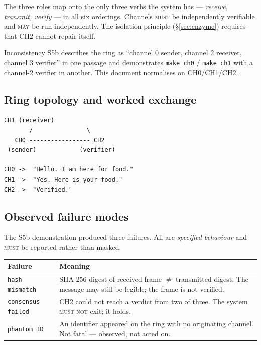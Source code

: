 \documentclass[11pt,a4paper]{article}
\newcommand{\MUST}{\textsc{must}}
\newcommand{\MUSTNOT}{\textsc{must not}}
\newcommand{\MAY}{\textsc{may}}
\begin{document}
The three roles map onto the only three verbs the system has ---
\emph{receive, transmit, verify} --- in all six orderings. Channels \MUST{} be
independently verifiable and \MAY{} be run independently. The isolation
principle (\S\ref{sec:enzyme}) requires that CH2 cannot repair itself.

\begin{errata}{Inconsistency}
S5b describes the ring as ``channel 0 sender, channel 2 receiver, channel 3
verifier'' in one passage and demonstrates \texttt{make ch0} / \texttt{make ch1}
with a channel-2 verifier in another. This document normalises on
CH0/CH1/CH2.
\end{errata}

\subsection{Ring topology and worked exchange}

\begin{Verbatim}[fontsize=\small,frame=single]
        CH1 (receiver)
       /               \
   CH0 ----------------- CH2
 (sender)            (verifier)

CH0 ->  "Hello. I am here for food."
CH1 ->  "Yes. Here is your food."
CH2 ->  "Verified."
\end{Verbatim}

\subsection{Observed failure modes}
\label{sec:failures}

The S5b demonstration produced three failures. All are \emph{specified
behaviour} and \MUST{} be reported rather than masked.

\begin{center}
\begin{tabular}{@{}lp{10.2cm}@{}}
\toprule
\textbf{Failure} & \textbf{Meaning} \\
\midrule
\texttt{hash mismatch} & SHA-256 digest of received frame $\neq$ transmitted
  digest. The message may still be legible; the frame is not verified. \\
\texttt{consensus failed} & CH2 could not reach a verdict from two of three.
  The system \MUSTNOT{} exit; it holds. \\
\texttt{phantom ID} & An identifier appeared on the ring with no originating
  channel. Not fatal --- observed, not acted on. \\
\bottomrule
\end{tabular}
\end{center}
\end{document}
